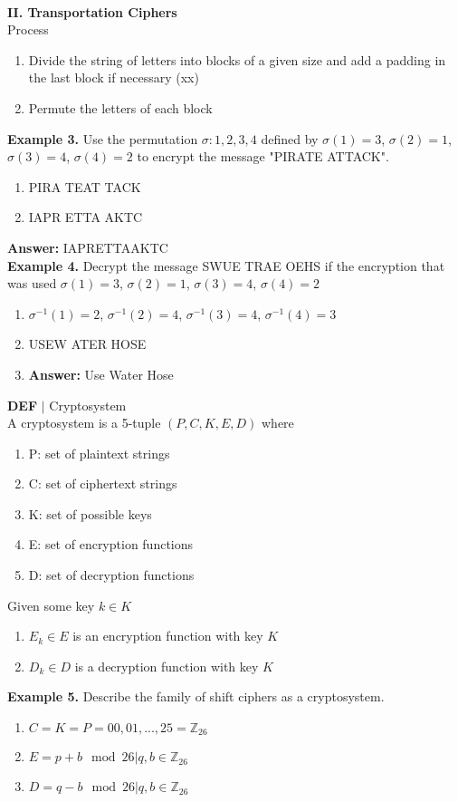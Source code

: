 \documentclass [12pt]{article}
\begin{document}
\vspace{0.2in}
\\
\noindent\textbf{II. Transportation Ciphers}\\
Process
\begin{enumerate}[1.]
    \item Divide the string of letters into blocks of a given size and add a padding in the last block if necessary (xx)
    \item Permute the letters of each block
\end{enumerate}
\noindent\textbf{Example 3.} Use the permutation $\sigma:{1,2,3,4}$ defined by $\sigma(1)=3$, $\sigma(2)=1$, $\sigma(3)=4$, $\sigma(4)=2$ to encrypt the message "PIRATE ATTACK".
\begin{enumerate}[\quad1.]
    \item PIRA TEAT TACK
    \item IAPR ETTA AKTC
\end{enumerate}
\quad\textbf{Answer: }IAPRETTAAKTC
\vspace{0.2in}
\\
\noindent\textbf{Example 4.} Decrypt the message SWUE TRAE OEHS if the encryption that was used $\sigma(1)=3$, $\sigma(2)=1$, $\sigma(3)=4$, $\sigma(4)=2$
\begin{enumerate}[\quad]
    \item $\sigma^{-1}(1)=2$, $\sigma^{-1}(2)=4$, $\sigma^{-1}(3)=4$, $\sigma^{-1}(4)=3$
    \item USEW ATER HOSE
    \item\textbf{Answer:} Use Water Hose
\end{enumerate}
\begin{framed}
\noindent\textbf{DEF} $|$ Cryptosystem\\
A cryptosystem is a 5-tuple $(P,C,K,E,D)$ where
\begin{enumerate}[\quad]
    \item P: set of plaintext strings
    \item C: set of ciphertext strings
    \item K: set of possible keys
    \item E: set of encryption functions
    \item D: set of decryption functions
\end{enumerate}
Given some key $k \in K$
\begin{enumerate}[$\cdot$]
    \item $E_k\in E$ is an encryption function with key $K$
    \item $D_k\in D$ is a decryption function with key $K$
\end{enumerate}
\end{framed}
\pagebreak
\noindent\textbf{Example 5.} Describe the family of shift ciphers as a cryptosystem.
\begin{enumerate}[\quad]
    \item $C=K=P={00,01,...,25}=\mathbb{Z}_{26}$ 
    \item $E={p+b\mod26|q,b\in\mathbb{Z}_{26}}$
    \item $D={q-b\mod26|q,b\in\mathbb{Z}_{26}}$
\end{enumerate}
\end{document}
